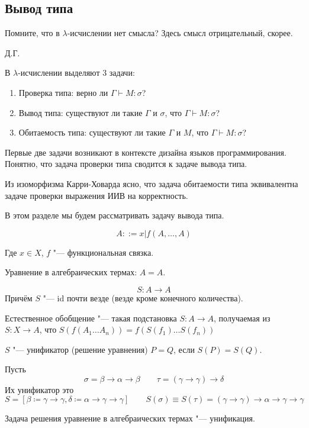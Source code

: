\subsection{\texorpdfstring{Вывод типа}{Type deduction}}
\epigraph{Помните, что в $\lambda$-исчислении нет смысла? Здесь смысл отрицательный, скорее.}{Д.Г.}

В $\lambda$-исчислении выделяют 3 задачи:
\begin{enumerate}[label=(\asbuk*)]
    \item Проверка типа: верно ли $\Gamma \vdash M : \sigma$?
    \item Вывод типа: существуют ли такие $\Gamma$ и $\sigma$, что $\Gamma \vdash M : \sigma$?
    \item Обитаемость типа: существуют ли такие $\Gamma$ и $M$, что $\Gamma \vdash M : \sigma$?
\end{enumerate}%
Первые две задачи возникают в контексте дизайна языков программирования.
Понятно, что задача проверки типа сводится к задаче вывода типа.

Из изоморфизма Карри-Ховарда ясно, что задача обитаемости типа эквивалентна задаче проверки выражения ИИВ на корректность.

В этом разделе мы будем рассматривать задачу вывода типа.

\begin{definition}
    \begin{bnf}
    \[
        A ::= x | f\left(A, \ldots, A\right)
    \]
    \end{bnf}%
    Где $x \in X$, $f$ "--- функциональная связка.
\end{definition}

Уравнение в алгебраических термах: $A = A$.

\begin{definition}[$S$-подстановка]
    \[
        S : A \rightarrow A
    \]
    Причём $S$ "--- id почти везде (везде кроме конечного количества).
\end{definition}

\begin{definition}
    Естественное обобщение "--- такая подстановка $S : A \rightarrow A$, получаемая из $S : X \rightarrow A$, что
    $S\left(f\left(A_1 \dots A_n\right)\right) = f\left(S(f_1) \ldots S(f_n)\right)$
\end{definition}

\begin{definition}[унификатор] \label{unificator}
    $S$ "--- унификатор (решение уравнения) $P=Q$, если $S(P)=S(Q)$.
\end{definition}
\begin{example}
    Пусть
    \[
        \sigma = \beta\rightarrow\alpha\rightarrow\beta \qquad \tau = (\gamma\rightarrow\gamma)\rightarrow\delta
    \]
    Их унификатор это
    \[
        S = [\beta \coloneqq \gamma\rightarrow\gamma, \delta \coloneqq \alpha\rightarrow\gamma\rightarrow\gamma]
        \qquad S(\sigma) \equiv S(\tau) = (\gamma\rightarrow\gamma)\rightarrow\alpha\rightarrow\gamma\rightarrow\gamma
    \]
\end{example}
Задача решения уравнение в алгебраических термах "--- унификация.

